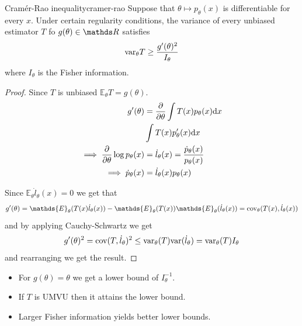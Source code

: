 \documentclass[12pt]{extarticle}
\newcommand{\cov}{{\operatorfont cov}}
\renewcommand{\var}{{\operatorfont var}}
\newcommand{\E}{\mathds{E}}
\begin{document}
\begin{theorem}{Cramér-Rao inequality}{cramer-rao}
    Suppose that $\theta \mapsto p_\theta(x)$ is differentiable for every $x$.
    Under certain regularity conditions, the variance of every unbiased estimator $T$ fo $g(\theta) \in \R$
    satisfies
    \begin{equation}
        \var_\theta T \geq \frac{g'(\theta)^2}{I_\theta}
    \end{equation}
    where $I_\theta$ is the Fisher information.
\end{theorem}
\begin{proof}
    Since $T$ is unbiased $\E_\theta T = g(\theta)$.
    \begin{align}
        g'(\theta)                             & = \pdv{\theta} \int T(x) p_\theta(x) \dd x                \\
                                               & \int T(x) p'_\theta(x) \dd x                              \\
        \implies \pdv{\theta} \log p_\theta(x) & = \dot l_\theta(x) = \frac{\dot p_\theta(x)}{p_\theta(x)} \\
        \implies \dot p_\theta(x)              & = \dot l_\theta(x) p_\theta(x)
    \end{align}

    Since $\E_\theta \dot l_\theta(x) = 0$ we get that
    \begin{equation}
        g'(\theta) = \E_\theta(T(x) \dot l_\theta (x)) - \E_\theta(T(x)) \E_\theta(\dot l_\theta(x)) = \cov_\theta(T(x), \dot l_\theta(x))
    \end{equation}
    and by applying Cauchy-Schwartz we get
    \begin{equation}
        g'(\theta)^2 = \cov(T, \dot l_\theta)^2 \leq \var_\theta (T) \var(\dot l_\theta) = \var_\theta(T) I_\theta
    \end{equation}
    and rearranging we get the result.
\end{proof}

\begin{corollary}{}{}
    \begin{itemize}
        \item For $g(\theta) = \theta$ we get a lower bound of $I_\theta^{-1}$.
        \item If $T$ is UMVU then it attains the lower bound.
        \item Larger Fisher information yields better lower bounds.
    \end{itemize}
\end{corollary}
\end{document}
